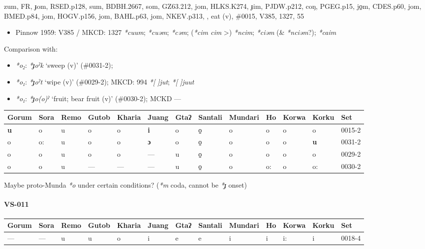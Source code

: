 \documentclass[a4paper,]{article}
\providecommand{\tightlist}{%
  \setlength{\itemsep}{0pt}\setlength{\parskip}{0pt}}
\let\oldparagraph\paragraph
\renewcommand{\paragraph}[1]{\oldparagraph{#1}\mbox{}}
\begin{document}
zum, FR, ɟom, RSED.p128, sum, BDBH.2667, som, GZ63.212, jom, HLKS.K274,
ɟim, PJDW.p212, coŋ, PGEG.p15, jo̠m, CDES.p60, jom, BMED.p84, jom,
HOGV.p156, jom, BAHL.p63, jom, NKEV.p313, , eat (v), \#0015, V385, 1327,
55

\begin{itemize}
\tightlist
\item
  Pinnow 1959: V385 / MKCD: 1327 \emph{*cuum}; \emph{*cuəm};
  \emph{*cəm}; (\emph{*cim cim} \textgreater{}) \emph{*ncim};
  \emph{*ciəm} (\& \emph{*nciəm}?); \emph{*caim}
\end{itemize}

Comparison with:

\begin{itemize}
\tightlist
\item
  \emph{*o₂}: \emph{*ɟoˀk} `sweep (v)' (\#0031-2);
\item
  \emph{*o₁}: \emph{*ɟoˀt} `wipe (v)' (\#0029-2); MKCD: 994 \emph{*{[}
  {]}jut}; \emph{*{[} {]}juut}
\item
  \emph{*o₁}: \emph{*ɟo(o)ˀ} `fruit; bear fruit (v)' (\#0030-2); MCKD
  ---
\end{itemize}

\begin{longtable}[]{@{}lllllllllllll@{}}
\toprule
Gorum & Sora & Remo & Gutob & Kharia & Juang & Gtaʔ & Santali & Mundari
& Ho & Korwa & Korku & Set\tabularnewline
\midrule
\endhead
\textbf{u} & o & u & o & o & \textbf{i} & o & o̠ & o & o & o & o &
0015-2\tabularnewline
o & o: & u & o & o & \textbf{ɔ} & o & o̠ & o & o & o & \textbf{u} &
0031-2\tabularnewline
o & o & u & o & o & --- & u & o̠ & o & o & o & o & 0029-2\tabularnewline
o & o & u & --- & --- & --- & u & o̠ & o & o: & o & o: &
0030-2\tabularnewline
\bottomrule
\end{longtable}

Maybe proto-Munda \emph{*o} under certain conditions? (\emph{*m} coda,
cannot be \emph{*ɟ} onset)

\paragraph{VS-011}\label{vs-011}

\begin{longtable}[]{@{}lllllllllllll@{}}
\toprule
Gorum & Sora & Remo & Gutob & Kharia & Juang & Gtaʔ & Santali & Mundari
& Ho & Korwa & Korku & Set\tabularnewline
\midrule
\endhead
--- & --- & u & u & o & i & e & e & i & i & i: & i &
0018-4\tabularnewline
\bottomrule
\end{longtable}
\end{document}
